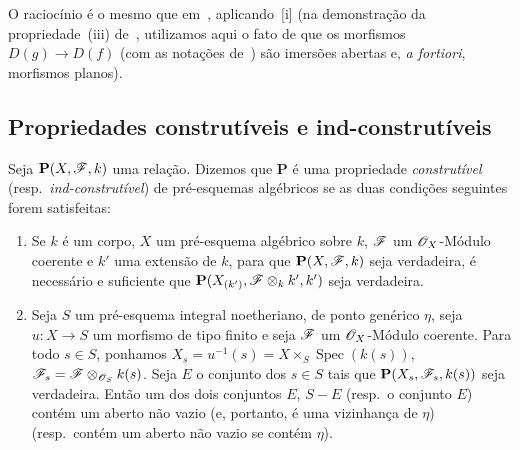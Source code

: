 O raciocínio é o mesmo que em~, aplicando~[i] (na demonstração da propriedade~(iii) de~, utilizamos aqui o fato de que os morfismos $D(g)\to D(f)$ (com as notações de~) são imersões abertas e, \emph{a fortiori}, morfismos planos).

\subsection{Propriedades construtíveis e ind-construtíveis}
\label{subsection:IV.9.2}
\label{IV.9.2}

\begin{definition}[9.2.1]
\label{IV.9.2.1}
Seja $\mathbf{P}(X,\mathscr{F},k)$ uma relação.
Dizemos que $\mathbf{P}$ é uma propriedade \emph{construtível} (resp.\ \emph{ind-construtível}) de pré-esquemas algébricos se as duas condições seguintes forem satisfeitas:
\begin{enumerate}[label=(\roman*)]
  \item Se $k$ é um corpo, $X$ um pré-esquema algébrico sobre $k$, $\mathscr{F}$ um $\mathscr{O}_X$-Módulo coerente e $k'$ uma extensão de $k$, para que $\mathbf{P}(X,\mathscr{F},k)$ seja verdadeira, é necessário e suficiente que $\mathbf{P}(X_{(k')},\mathscr{F}\otimes_k k',k')$ seja verdadeira.
  \item Seja $S$ um pré-esquema integral noetheriano, de ponto genérico $\eta$, seja $u:X\to S$ um morfismo de tipo finito e seja $\mathscr{F}$ um $\mathscr{O}_X$-Módulo coerente.
Para todo $s\in S$, ponhamos $X_s=u^{-1}(s)=X\times_S\operatorname{Spec}(k(s))$, $\mathscr{F}_s=\mathscr{F}\otimes_{\mathscr{O}_S}k(s)$.
Seja $E$ o conjunto dos $s\in S$ tais que $\mathbf{P}(X_s,\mathscr{F}_s,k(s))$ seja verdadeira.
Então um dos dois conjuntos $E$, $S-E$ (resp.\ o conjunto $E$) contém um aberto não vazio (e, portanto, é uma vizinhança de $\eta$) (resp.\ contém um aberto não vazio se contém $\eta$).
\end{enumerate}
\end{definition}


